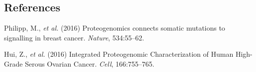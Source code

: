 \documentclass[12pt]{article}
\begin{document}
\subsection*{References}

\begin{description}

\item
Philipp, M., {\it et al.} (2016) Proteogenomics connects somatic mutations to signalling in breast cancer. \textit{Nature}, 534:55--62.
\item
Hui, Z., {\it et al.} (2016) Integrated Proteogenomic Characterization of Human High-Grade Serous Ovarian Cancer. \textit{Cell}, 166:755--765.
\end{description}
\end{document}
